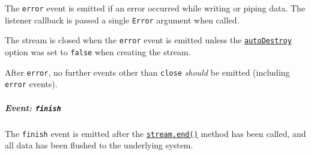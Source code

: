 The \texttt{\textquotesingle{}error\textquotesingle{}} event is emitted
if an error occurred while writing or piping data. The listener callback
is passed a single \texttt{Error} argument when called.

The stream is closed when the
\texttt{\textquotesingle{}error\textquotesingle{}} event is emitted
unless the \hyperref[new-streamwritableoptions]{\texttt{autoDestroy}}
option was set to \texttt{false} when creating the stream.

After \texttt{\textquotesingle{}error\textquotesingle{}}, no further
events other than \texttt{\textquotesingle{}close\textquotesingle{}}
\emph{should} be emitted (including
\texttt{\textquotesingle{}error\textquotesingle{}} events).

\subparagraph{\texorpdfstring{Event:
\texttt{\textquotesingle{}finish\textquotesingle{}}}{Event: \textquotesingle finish\textquotesingle{}}}\label{event-finish}

The \texttt{\textquotesingle{}finish\textquotesingle{}} event is emitted
after the
\hyperref[writableendchunk-encoding-callback]{\texttt{stream.end()}}
method has been called, and all data has been flushed to the underlying
system.

\begin{Shaded}
\begin{Highlighting}[]
\OperatorTok{=} \NormalTok{()}\OperatorTok{;}
\NormalTok{ (}\OperatorTok{=} \OperatorTok{;}\OperatorTok{\textless{}} \OperatorTok{;}\OperatorTok{++}\NormalTok{) \{}
\NormalTok{(}\SpecialCharTok{$\{}\SpecialCharTok{\}}\VerbatimStringTok{!}\VerbatimStringTok{\textasciigrave{}}\NormalTok{)}\OperatorTok{;}
\NormalTok{\}}
\NormalTok{(}\OperatorTok{,}\NormalTok{ () }\KeywordTok{=\textgreater{}}\NormalTok{ \{}
  \NormalTok{(}\NormalTok{)}\OperatorTok{;}
\NormalTok{\})}\OperatorTok{;}
\NormalTok{(}\StringTok{\textquotesingle{}}\NormalTok{)}\OperatorTok{;}
\end{Highlighting}
\end{Shaded}

